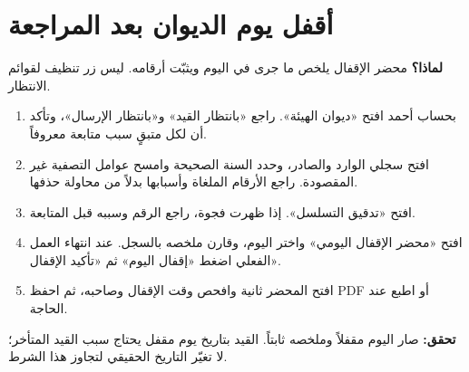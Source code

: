 \section{أقفل يوم الديوان بعد المراجعة}
\label{sec:day-close}
\textbf{لماذا؟} محضر الإقفال يلخص ما جرى في اليوم ويثبّت أرقامه. ليس زر تنظيف لقوائم الانتظار.
\begin{enumerate}
\item بحساب أحمد افتح «ديوان الهيئة». راجع «بانتظار القيد» و«بانتظار الإرسال»، وتأكد أن لكل متبقٍ سبب متابعة معروفاً.
\item افتح سجلي الوارد والصادر، وحدد السنة الصحيحة وامسح عوامل التصفية غير المقصودة. راجع الأرقام الملغاة وأسبابها بدلاً من محاولة حذفها.
\item افتح «تدقيق التسلسل». إذا ظهرت فجوة، راجع الرقم وسببه قبل المتابعة.
\item افتح «محضر الإقفال اليومي» واختر اليوم، وقارن ملخصه بالسجل. عند انتهاء العمل الفعلي اضغط «إقفال اليوم» ثم «تأكيد الإقفال».
\item افتح المحضر ثانية وافحص وقت الإقفال وصاحبه، ثم احفظ PDF أو اطبع عند الحاجة.
\end{enumerate}
\textbf{تحقق:} صار اليوم مقفلاً وملخصه ثابتاً. القيد بتاريخ يوم مقفل يحتاج سبب القيد المتأخر؛ لا تغيّر التاريخ الحقيقي لتجاوز هذا الشرط.

